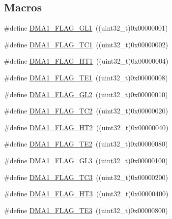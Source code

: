 \subsection*{Macros}
\begin{DoxyCompactItemize}
\item 
\#define \hyperlink{group___d_m_a__flags__definition_gad1ac00f031065682ac125f6f9be061e6}{D\+M\+A1\+\_\+\+F\+L\+A\+G\+\_\+\+G\+L1}~((uint32\+\_\+t)0x00000001)
\item 
\#define \hyperlink{group___d_m_a__flags__definition_gaa9b4d1112bcfd34136007b813a11187e}{D\+M\+A1\+\_\+\+F\+L\+A\+G\+\_\+\+T\+C1}~((uint32\+\_\+t)0x00000002)
\item 
\#define \hyperlink{group___d_m_a__flags__definition_ga9c806b96cfdcebddb64f70d13ad32270}{D\+M\+A1\+\_\+\+F\+L\+A\+G\+\_\+\+H\+T1}~((uint32\+\_\+t)0x00000004)
\item 
\#define \hyperlink{group___d_m_a__flags__definition_gae30157801ac1460dab86a8f54cfd3479}{D\+M\+A1\+\_\+\+F\+L\+A\+G\+\_\+\+T\+E1}~((uint32\+\_\+t)0x00000008)
\item 
\#define \hyperlink{group___d_m_a__flags__definition_gad27b8a0cf554638d78fb67a010c0419b}{D\+M\+A1\+\_\+\+F\+L\+A\+G\+\_\+\+G\+L2}~((uint32\+\_\+t)0x00000010)
\item 
\#define \hyperlink{group___d_m_a__flags__definition_ga0eff24f7e6b2b874328d531ee9315b20}{D\+M\+A1\+\_\+\+F\+L\+A\+G\+\_\+\+T\+C2}~((uint32\+\_\+t)0x00000020)
\item 
\#define \hyperlink{group___d_m_a__flags__definition_gae154ffd90ebaec11f9ed1be00e69f149}{D\+M\+A1\+\_\+\+F\+L\+A\+G\+\_\+\+H\+T2}~((uint32\+\_\+t)0x00000040)
\item 
\#define \hyperlink{group___d_m_a__flags__definition_ga23bfb917d32a8dd5a96d343ef5f6ea46}{D\+M\+A1\+\_\+\+F\+L\+A\+G\+\_\+\+T\+E2}~((uint32\+\_\+t)0x00000080)
\item 
\#define \hyperlink{group___d_m_a__flags__definition_gaf3eccffb15e5b64611774b22f8b43e91}{D\+M\+A1\+\_\+\+F\+L\+A\+G\+\_\+\+G\+L3}~((uint32\+\_\+t)0x00000100)
\item 
\#define \hyperlink{group___d_m_a__flags__definition_ga0490d6c6fca12f4bcc61ef69e3fbdd93}{D\+M\+A1\+\_\+\+F\+L\+A\+G\+\_\+\+T\+C3}~((uint32\+\_\+t)0x00000200)
\item 
\#define \hyperlink{group___d_m_a__flags__definition_ga9c801c1702fcc41b74bb7397ce80a8fc}{D\+M\+A1\+\_\+\+F\+L\+A\+G\+\_\+\+H\+T3}~((uint32\+\_\+t)0x00000400)
\item 
\#define \hyperlink{group___d_m_a__flags__definition_gaa0b3d86f09829d0388273f0cd51698cc}{D\+M\+A1\+\_\+\+F\+L\+A\+G\+\_\+\+T\+E3}~((uint32\+\_\+t)0x00000800)

\end{DoxyCompactItemize}
